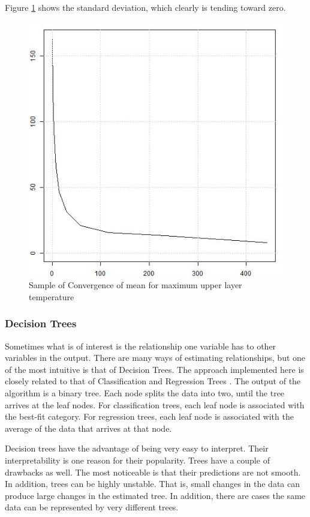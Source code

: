 \documentclass[12pt,twoside]{book}
\begin{document}
Figure \ref{simple_max_temp_sd} shows the standard deviation, which clearly is tending toward zero.

\begin{figure}[h!]
\centering
\includegraphics[width=4.5in]{FIGURES/simple_max_temp_sd.jpeg}
\caption{Sample of Convergence of mean for maximum upper layer temperature}
\label{simple_max_temp_sd}
\end{figure}

\subsubsection{Decision Trees}

Sometimes what is of interest is the relationship one variable has to other variables in the output. There are many ways of estimating relationships, but one of the most intuitive is that of Decision Trees. The approach implemented here is closely related to that of Classification and Regression Trees \cite{Haste_2009}. The output of the algorithm is a binary tree. Each node splits the data into two, until the tree arrives at the leaf nodes. For classification trees, each leaf node is associated with the best-fit category. For regression trees, each leaf node is associated with the average of the data that arrives at that node.

Decision trees have the advantage of being very easy to interpret. Their interpretability is one reason for their popularity. Trees have a couple of drawbacks as well. The most noticeable is that their predictions are not smooth. In addition, trees can be highly unstable. That is, small changes in the data can produce large changes in the estimated tree. In addition, there are cases the same data can be represented by very different trees.
\end{document}
